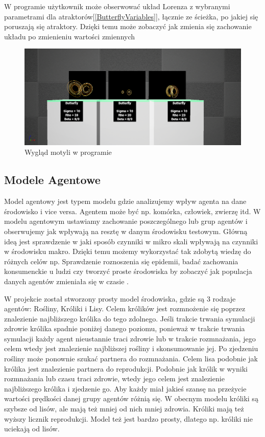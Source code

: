 \documentclass[a4paper,12pt,reqno]{article}
\begin{document}
W programie użytkownik może obserwować układ Lorenza z wybranymi parametrami dla atraktorów[\ref{ButterflyVariables}], łącznie ze ścieżka, po jakiej się poruszają się atraktory. Dzięki temu może zobaczyć jak zmienia się zachowanie układu po zmienieniu wartości zmiennych

\begin{figure}[H]%
\centering
\includegraphics[width=0.7\columnwidth]{graphics/butterfly/ButterflyInUE_1.png}
\caption{Wygląd motyli w programie
\label{ButterflyEffectUE4}}%
%
\qquad
\end{figure}  

\newpage
\subsection{Modele Agentowe}

Model agentowy jest typem modelu gdzie analizujemy wpływ agenta na dane środowisko i vice versa. Agentem może być np. komórka, człowiek, zwierzę itd. W modelu agentowym ustawiamy zachowanie poszczególnego lub grup agentów i obserwujemy jak wpływają na resztę w danym środowisku testowym. Główną ideą jest sprawdzenie w jaki sposób czynniki w mikro skali wpływają na czynniki w środowisku makro. Dzięki temu możemy wykorzystać tak zdobytą wiedzę do różnych celów np. Sprawdzenie roznoszenia się epidemii, badać zachowania konsumenckie u ludzi czy tworzyć proste środowiska  by zobaczyć jak populacja danych agentów zmieniała się w czasie \cite{agent_examples}. 

W projekcie został stworzony prosty model środowiska, gdzie są 3 rodzaje agentów: Rośliny, Króliki i Lisy. Celem królików jest rozmnożenie się poprzez znalezienie najbliższego królika do tego zdolnego. Jeśli trakcie trwania symulacji zdrowie królika spadnie poniżej danego poziomu, ponieważ w trakcie trwania symulacji każdy agent nieustannie traci zdrowie lub w trakcie rozmnażania, jego celem wtedy jest znalezienie najbliższej rośliny i skonsumowanie jej. Po zjedzeniu rośliny może ponownie szukać partnera do rozmnażania.  Celem lisa podobnie jak królika jest znalezienie partnera do reprodukcji. Podobnie jak królik w wyniki rozmnażania lub czasu traci zdrowie, wtedy jego celem jest znalezienie najbliższego królika i zjedzenie go. Aby każdy miał jakieś szansę na przeżycie wartości prędkości danej grupy agentów różnią się. W obecnym modelu króliki są szybsze od lisów, ale mają też mniej od nich mniej zdrowia. Króliki mają też wyższy licznik reprodukcji. Model też jest bardzo prosty, dlatego np. króliki nie uciekają od lisów.
\end{document}
